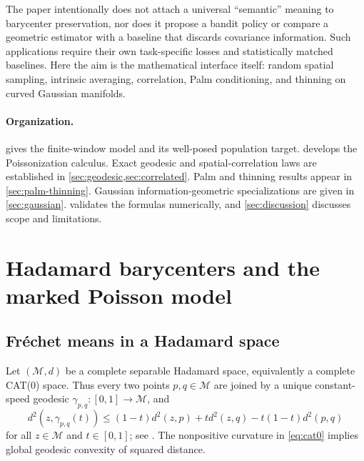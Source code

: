 \documentclass[11pt,a4paper]{article}
\theoremstyle{remark}
\newcommand{\M}{\mathcal M}
\begin{document}
The paper intentionally does not attach a universal ``semantic'' meaning to barycenter preservation, nor does it propose a bandit policy or compare a geometric estimator with a baseline that discards covariance information.  Such applications require their own task-specific losses and statistically matched baselines.  Here the aim is the mathematical interface itself: random spatial sampling, intrinsic averaging, correlation, Palm conditioning, and thinning on curved Gaussian manifolds.

\paragraph{Organization.}
 gives the finite-window model and its well-posed population target.   develops the Poissonization calculus.  Exact geodesic and spatial-correlation laws are established in \cref{sec:geodesic,sec:correlated}.  Palm and thinning results appear in \cref{sec:palm-thinning}.  Gaussian information-geometric specializations are given in \cref{sec:gaussian}.   validates the formulas numerically, and \cref{sec:discussion} discusses scope and limitations.

\section{Hadamard barycenters and the marked Poisson model}
\label{sec:preliminaries}

\subsection{Fr\'echet means in a Hadamard space}

Let \((\M,d)\) be a complete separable Hadamard space, equivalently a complete CAT(0) space.  Thus every two points \(p,q\in\M\) are joined by a unique constant-speed geodesic \(\gamma_{p,q}:[0,1]\to\M\), and
\begin{equation}
\label{eq:cat0}
 d^2\!\left(z,\gamma_{p,q}(t)\right)
 \le (1-t)d^2(z,p)+t d^2(z,q)-t(1-t)d^2(p,q)
\end{equation}
for all \(z\in\M\) and \(t\in[0,1]\); see \cite{bridson1999,sturm2003}.  The nonpositive curvature in \eqref{eq:cat0} implies global geodesic convexity of squared distance.
\end{document}
